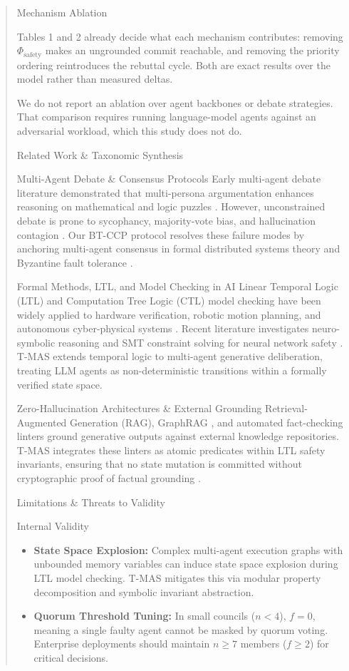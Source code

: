 \documentclass[10pt,twocolumn,letterpaper]{article}
\begin{document}
\begin{quote}
{ Mechanism Ablation

Tables 1 and 2 already decide what each mechanism contributes: removing $\Phi_{\text{safety}}$ makes an ungrounded commit reachable, and removing the priority ordering reintroduces the rebuttal cycle. Both are exact results over the model rather than measured deltas.

We do not report an ablation over agent backbones or debate strategies. That comparison requires running language-model agents against an adversarial workload, which this study does not do.



 Related Work \& Taxonomic Synthesis

 Multi-Agent Debate \& Consensus Protocols
Early multi-agent debate literature demonstrated that multi-persona argumentation enhances reasoning on mathematical and logic puzzles \cite{arxiv_2005_14165,arxiv_2203_02155}. However, unconstrained debate is prone to sycophancy, majority-vote bias, and hallucination contagion \cite{arxiv_2406_00584}. Our BT-CCP protocol resolves these failure modes by anchoring multi-agent consensus in formal distributed systems theory and Byzantine fault tolerance \cite{crossref_10_1109_access_2026_3656309}.

 Formal Methods, LTL, and Model Checking in AI
Linear Temporal Logic (LTL) and Computation Tree Logic (CTL) model checking have been widely applied to hardware verification, robotic motion planning, and autonomous cyber-physical systems \cite{crossref_10_18653_v1_2026_findings_acl_1933}. Recent literature investigates neuro-symbolic reasoning and SMT constraint solving for neural network safety \cite{arxiv_2404_01131}. T-MAS extends temporal logic to multi-agent generative deliberation, treating LLM agents as non-deterministic transitions within a formally verified state space.

 Zero-Hallucination Architectures \& External Grounding
Retrieval-Augmented Generation (RAG), GraphRAG \cite{arxiv_2501_14050}, and automated fact-checking linters ground generative outputs against external knowledge repositories. T-MAS integrates these linters as atomic predicates within LTL safety invariants, ensuring that no state mutation is committed without cryptographic proof of factual grounding \cite{arxiv_2405_01543,crossref_10_1201_9788743808145_14}.



 Limitations \& Threats to Validity

 Internal Validity
\begin{itemize}
  \item \textbf{State Space Explosion:} Complex multi-agent execution graphs with unbounded memory variables can induce state space explosion during LTL model checking. T-MAS mitigates this via modular property decomposition and symbolic invariant abstraction.
  \item \textbf{Quorum Threshold Tuning:} In small councils ($n < 4$), $f = 0$, meaning a single faulty agent cannot be masked by quorum voting. Enterprise deployments should maintain $n \ge 7$ members ($f \ge 2$) for critical decisions.
\end{itemize}

}
\end{quote}
\end{document}
